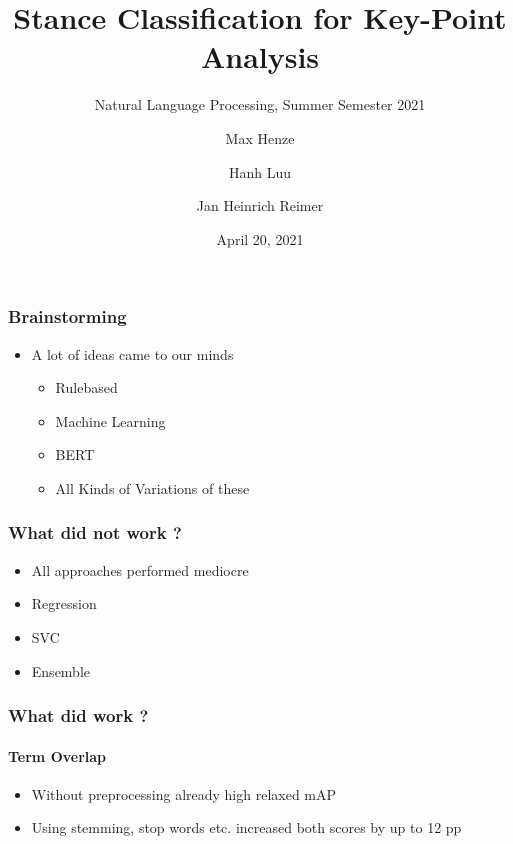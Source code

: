 \documentclass[english,handout]{mlutalk}
\title{Stance Classification for Key-Point Analysis}
\subtitle{Natural Language Processing, Summer Semester 2021}
\author{Max Henze \and Hanh Luu \and Jan Heinrich Reimer}
\institute{Martin Luther University Halle-Wittenberg}
\date{April 20, 2021}
\begin{document}
\titleframe

\begin{frame}
  \frametitle{Brainstorming}

  \begin{itemize}
    \item A lot of ideas came to our minds
    \begin{itemize}
      \item Rulebased
      \item Machine Learning
      \item BERT
      \item All Kinds of Variations of these
    \end{itemize}   
  \end{itemize}

\end{frame}

\begin{frame}
  \frametitle{What did not work ?}
    \begin{itemize}
      \item All approaches performed mediocre
      \item Regression 
      \item SVC 
      \item Ensemble 
    \end{itemize}
  

\end{frame}

\begin{frame}
  \frametitle{What did work ?}
  \framesubtitle{Term Overlap}
    
    \begin{itemize}
      \item Without preprocessing already high relaxed mAP
      \item Using stemming, stop words etc. increased both scores by up to 12 pp 
    \end{itemize}

\end{frame}
\end{document}
